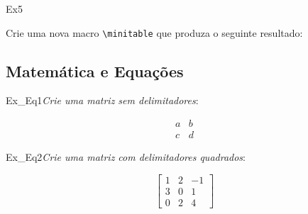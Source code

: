 \begin{texercise}{Ex5}
\begin{tcboutputlisting}
\newcommand{\minitable}[2]{%
    \begin{center}\begin{tabular}{p{10cm}}\hline%
    \multicolumn{1}{c}{\bfseries#1}\\\hline%
    #2\\\hline%
    \end{tabular}\end{center}}
    \end{tcboutputlisting}
    \tcbuselistingtext%
    Crie uma nova macro \verb+\minitable+ que produza o seguinte resultado:\par\smallskip\begin{tcbwritetemp}
    \end{tcbwritetemp}
    \tcbusetemplisting\par\smallskip\tcbusetemp%
\end{texercise}

\subsection*{Matemática e Equações}
\label{sec:exec_mat_eqs}

\begin{texercise}{Ex_Eq1}\textit{Crie uma matriz sem delimitadores}:\par\smallskip%
\begin{tcboutputlisting}
    \begin{center}
        \begin{equation*}
            \begin{matrix} 
                a & b \\ 
                c & d 
            \end{matrix}
        \end{equation*}
    \end{center}
\end{tcboutputlisting}
\tcbuselistingtext%
\end{texercise}

\begin{texercise}{Ex_Eq2}\textit{Crie uma matriz com delimitadores quadrados}:\par\smallskip%
\begin{tcboutputlisting}
    \begin{center}
        \begin{equation*}
            \begin{bmatrix} 
                1 & 2 & -1 \\ 
                3 & 0 & 1 \\ 
                0 & 2 & 4 
            \end{bmatrix}
        \end{equation*}
    \end{center}
\end{tcboutputlisting}
\tcbuselistingtext%
\end{texercise}

